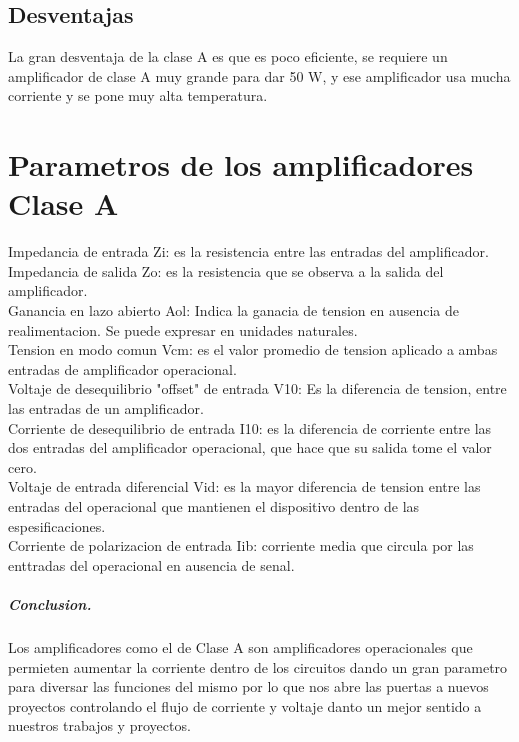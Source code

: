 \documentclass[12pt,a4paper]{report}
\begin{document}
\section{Desventajas}
La gran desventaja de la clase A es que es poco eficiente, se requiere un amplificador de clase A muy grande para dar 50 W, y ese amplificador usa mucha corriente y se pone muy alta temperatura.
\chapter{Parametros de los amplificadores Clase A}
Impedancia de entrada Zi: es la resistencia entre las entradas del amplificador.\\
Impedancia de salida Zo: es la resistencia que se observa a la salida del amplificador.\\
Ganancia en lazo abierto Aol: Indica la ganacia de tension en ausencia de realimentacion. Se puede expresar en unidades naturales.\\
Tension en modo comun Vcm: es el valor promedio de tension aplicado a ambas entradas de amplificador operacional.\\
Voltaje de desequilibrio "offset" de entrada V10: Es la diferencia de tension, entre las entradas de un amplificador.\\
Corriente de desequilibrio de entrada I10: es la diferencia de corriente entre las dos entradas del amplificador operacional, que hace que su salida tome el valor cero.\\
Voltaje de entrada diferencial Vid: es la mayor diferencia de tension entre las entradas del operacional que mantienen el dispositivo dentro de las espesificaciones.
\\
Corriente de polarizacion de entrada Iib: corriente media que circula por las enttradas del operacional en ausencia de senal.\\
\paragraph{Conclusion.}
Los amplificadores como el de Clase A son amplificadores operacionales que permieten aumentar la corriente dentro de los circuitos dando un gran parametro para diversar las funciones del mismo por lo que nos abre las puertas a nuevos proyectos controlando el flujo de corriente y voltaje danto un mejor sentido a nuestros trabajos y proyectos.
\end{document}

